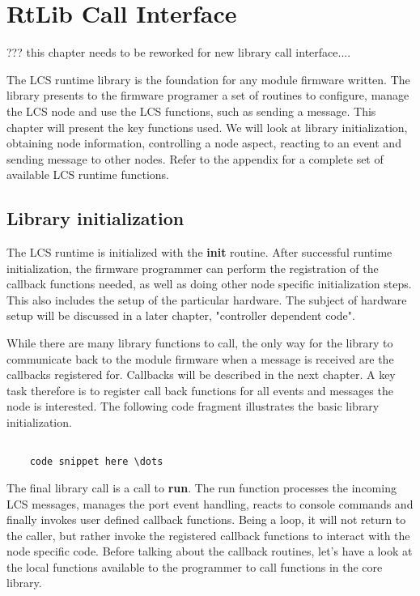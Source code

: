 \chapter{RtLib Call Interface}

??? this chapter needs to be reworked for new library call interface....

The LCS runtime library is the foundation for any module firmware written. The library presents to the firmware programer a set of routines to configure, manage the LCS node and use the LCS functions, such as sending a message. This chapter will present the key functions used. We will look at library initialization, obtaining node information, controlling a node aspect, reacting to an event and sending message to other nodes.
Refer to the appendix for a complete set of available LCS runtime functions.

\section{Library initialization}

The LCS runtime is initialized with the \textbf{init} routine. After successful runtime initialization, the firmware programmer can perform the registration of the callback functions needed, as well as doing other node specific initialization steps. This also includes the setup of the particular hardware. The subject of hardware setup will be discussed in a later chapter, "controller dependent code". 

While there are many library functions to call, the only way for the library to communicate back to the module firmware when a message is received are the callbacks registered for. Callbacks will be described in the next chapter. A key task therefore is to register call back functions for all events and messages the node is interested. The following code fragment illustrates the basic library initialization.

\lstset{language=c++, style=codesnippetstyle}
\begin{lstlisting}
   
    code snippet here \dots

\end{lstlisting}


The final library call is a call to \textbf{run}. The run function processes the incoming LCS messages, manages the port event handling, reacts to console commands and finally invokes user defined callback functions. Being a loop, it will not return to the caller, but rather invoke the registered callback functions to interact with the node specific code. Before talking about the callback routines, let's have a look at the local functions available to the  programmer to call functions in the core library.

